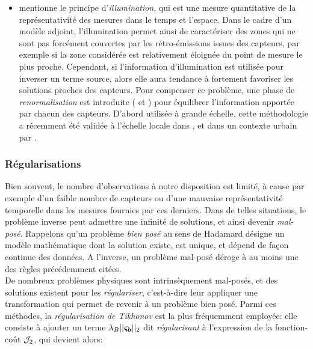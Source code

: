 \begin{itemize}
	 \item \cite{Issartel2005} mentionne le principe d'\textit{illumination}, qui est une mesure quantitative de la représentativité des mesures dans le temps et l'espace. Dans le cadre d'un modèle adjoint, l'illumination permet ainsi de caractériser des zones qui ne sont pas forcément couvertes par les rétro-émissions issues des capteurs, par exemple si la zone considérée est relativement éloignée du point de mesure le plus proche. Cependant, si l'information d'illumination est utilisée pour inverser un terme source, alors elle aura tendance à fortement favoriser les solutions proches des capteurs. Pour compenser ce problème, une phase de \textit{renormalisation} est introduite (\cite{Issartel2007} et \cite{Sharan2009}) pour équilibrer l'information apportée par chacun des capteurs. D'abord utilisée à grande échelle, cette méthodologie a récemment été validée à l'échelle locale dans \cite{Singh2014}, et dans un contexte urbain par \cite{Kumar2015}. \\

\end{itemize}

\subsubsection{Régularisations}

Bien souvent, le nombre d'observations à notre disposition est limité, à cause par exemple d'un faible nombre de capteurs ou d'une mauvaise représentativité temporelle dans les mesures fournies par ces derniers. Dans de telles situations, le problème inverse peut admettre une infinité de solutions, et ainsi devenir \textit{mal-posé}. Rappelons qu'un problème \textit{bien posé} au sens de Hadamard \cite{Hadamard1902} désigne un modèle mathématique dont la solution existe, est unique, et dépend de façon continue des données. A l'inverse, un problème mal-posé déroge à au moins une des règles précédemment citées. \\

De nombreux problèmes physiques sont intrinsèquement mal-posés, et des solutions existent pour les \textit{régulariser}, c'est-à-dire leur appliquer une transformation qui permet de revenir à un problème bien posé. Parmi ces méthodes, la \textit{régularisation de Tikhonov} \cite{Tikhonov1963} est la plus fréquemment employée: elle consiste à ajouter un terme $\lambda_B ||{\bm{\varsigma_b}}||_2$ dit \textit{régularisant} à l'expression de la fonction-coût ${\mathcal{J}}_2$, qui devient alors:

